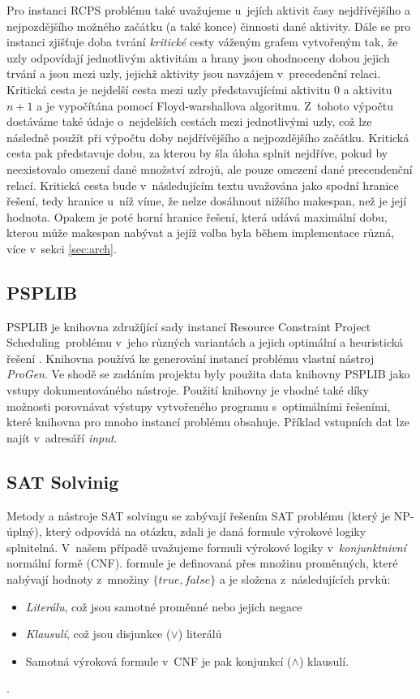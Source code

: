 \documentclass[a4paper, 12pt]{article}
\newcommand{\rcps}[0]{Resource Constraint Project Scheduling}
\begin{document}
Pro instanci RCPS problému také uvažujeme u~jejích aktivit časy nejdřívějšího a nejpozdějšího možného začátku (a
také konce) činnosti dané aktivity.
Dále se pro instanci zjišťuje doba tvrání \emph{kritické} cesty váženým grafem vytvořeným tak, že uzly odpovídají jednotlivým
aktivitám a hrany jsou ohodnoceny dobou jejich trvání a jsou mezi uzly, jejichž aktivity jsou navzájem v~precedenční
relaci.
Kritická cesta je nejdelší cesta mezi uzly představujícími aktivitu $0$ a aktivitu $n+1$ a je vypočítána
pomocí Floyd-warshallova algoritmu.
Z~tohoto výpočtu dostáváme také údaje o~nejdelších cestách mezi jednotlivými uzly, což lze následně použít
při výpočtu doby nejdřívějšího a nejpozdějšího začátku.
Kritická cesta pak představuje dobu, za kterou by šla úloha splnit nejdříve, pokud by neexistovalo omezení dané
množství zdrojů, ale pouze omezení dané precendenční relací.
Kritická cesta bude v~následujícím textu uvažována jako spodní hranice řešení, tedy hranice u~níž víme, že nelze
dosáhnout nižšího makespan, než je její hodnota.
Opakem je poté horní hranice řešení, která udává maximální dobu, kterou může makespan nabývat a jejíž volba
byla během implementace různá, více v~sekci \ref{sec:arch}.

\subsection{PSPLIB}
PSPLIB je knihovna združíjící sady instancí \rcps\ problému v~jeho různých variantách a jejich optimální a heuristická řešení \cite{psplib}.
Knihovna používá ke generování instancí problému vlastní nástroj \emph{ProGen}.
Ve shodě se zadáním projektu byly použita data knihovny PSPLIB jako vstupy dokumentováného nástroje.
Použití knihovny je vhodné také díky možnosti porovnávat výstupy vytvořeného programu s~optimálními řešeními, které
knihovna pro mnoho instancí problému obsahuje.
Příklad vstupních dat lze najít v~adresáří \emph{input}.

\subsection{SAT Solvinig}
Metody a nástroje SAT solvingu se zabývají řešením SAT problému (který je NP-úplný),
který odpovídá na otázku, zdali je daná formule výrokové logiky splnitelná.
V~našem případě uvažujeme formuli výrokové logiky v~\emph{konjunktnivní} normální formě (CNF).
formule je definovaná přes množinu proměnných, které nabývají hodnoty z~množiny $\{true, false\}$
a je složena z~následujících prvků:
 \begin{itemize}
 	\item \emph{Literálu}, což jsou samotné proměnné nebo jejich negace
 	\item \emph{Klausulí}, což jsou disjunkce ($\vee$) literálů
	\item Samotná výroková formule v~CNF je pak konjunkcí ($\wedge$) klausulí.
 \end{itemize}.
\end{document}
